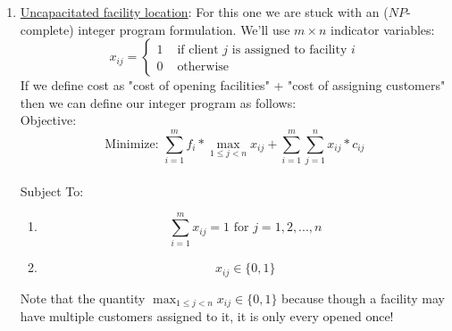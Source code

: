 \documentclass[10pt, letterpaper, twosided]{article}
\begin{document}
\begin{enumerate}[label=(\alph*)]
\item \underline{Uncapacitated facility location}:  For this one we are stuck with an ($NP$-complete) integer program formulation.  We'll use $m \times n$ indicator variables: 
\[
x_{ij} =
\begin{cases}
			1 & \text{ if client $j$ is assigned to facility $i$} \\
			0 & \text{ otherwise}
\end{cases}
\]
If we define cost as "cost of opening facilities" + "cost of assigning customers" then we can define our integer program as follows:\\

Objective: $$\text{Minimize: } \sum\limits_{i=1}^m f_i * \max_{1 \leq j < n} x_{ij} + \sum\limits_{i=1}^m\sum\limits_{j=1}^n x_{ij}*c_{ij}$$\\

Subject To:\\
\begin{enumerate}[label=(\roman*)]
\item $$\sum\limits_{i=1}^m x_{ij} = 1 \text{ for } j=1,2,...,n$$
\item $$x_{ij} \in \{0,1\}$$
\end{enumerate}
Note that the quantity $\max_{1 \leq j < n} x_{ij} \in \{0,1\}$ because though a facility may have multiple customers assigned
to it, it is only every opened once!

\end{enumerate}
\end{document}
